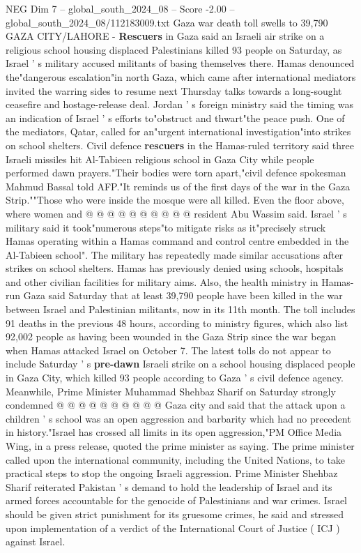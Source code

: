 \begin{textsample}{NEG Dim 7 – global\_south\_2024\_08 – Score -2.00 – global\_south\_2024\_08/112183009.txt}  \label{ex:f7_neg_270}
Gaza war death toll swells to 39,790 GAZA CITY/LAHORE - \textbf{Rescuers} in Gaza said an Israeli air strike on a religious school housing displaced Palestinians killed 93 people on Saturday, as Israel ' s military accused militants of basing themselves there.
Hamas denounced the"dangerous escalation"in north Gaza, which came after international mediators invited the warring sides to resume next Thursday talks towards a long-sought ceasefire and hostage-release deal.
Jordan ' s foreign ministry said the timing was an indication of Israel ' s efforts to"obstruct and thwart"the peace push.
One of the mediators, Qatar, called for an"urgent international investigation"into strikes on school shelters.
Civil defence \textbf{rescuers} in the Hamas-ruled territory said three Israeli missiles hit Al-Tabieen religious school in Gaza City while people performed dawn prayers."Their bodies were torn apart,"civil defence spokesman Mahmud Bassal told AFP."It reminds us of the first days of the war in the Gaza Strip.""Those who were inside the mosque were all killed.
Even the floor above, where women and @ @ @ @ @ @ @ @ @ @ resident Abu Wassim said.
Israel ' s military said it took"numerous steps"to mitigate risks as it"precisely struck Hamas operating within a Hamas command and control centre embedded in the Al-Tabieen school".
The military has repeatedly made similar accusations after strikes on school shelters.
Hamas has previously denied using schools, hospitals and other civilian facilities for military aims.
Also, the health ministry in Hamas-run Gaza said Saturday that at least 39,790 people have been killed in the war between Israel and Palestinian militants, now in its 11th month.
The toll includes 91 deaths in the previous 48 hours, according to ministry figures, which also list 92,002 people as having been wounded in the Gaza Strip since the war began when Hamas attacked Israel on October 7.
The latest tolls do not appear to include Saturday ' s \textbf{pre-dawn} Israeli strike on a school housing displaced people in Gaza City, which killed 93 people according to Gaza ' s civil defence agency.
Meanwhile, Prime Minister Muhammad Shehbaz Sharif on Saturday strongly condemned @ @ @ @ @ @ @ @ @ @ Gaza city and said that the attack upon a children ' s school was an open aggression and barbarity which had no precedent in history."Israel has crossed all limits in its open aggression,"PM Office Media Wing, in a press release, quoted the prime minister as saying.
The prime minister called upon the international community, including the United Nations, to take practical steps to stop the ongoing Israeli aggression.
Prime Minister Shehbaz Sharif reiterated Pakistan ' s demand to hold the leadership of Israel and its armed forces accountable for the genocide of Palestinians and war crimes.
Israel should be given strict punishment for its gruesome crimes, he said and stressed upon implementation of a verdict of the International Court of Justice ( ICJ ) against Israel.

\end{textsample}
